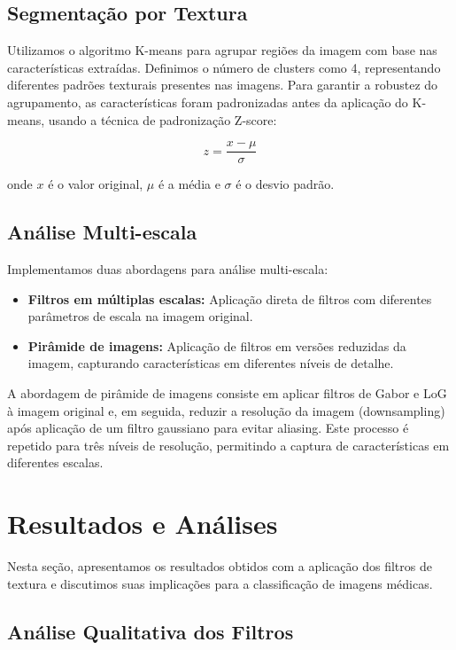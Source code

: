 \documentclass[sigconf,nonacm]{acmart}
\begin{document}
\subsection{Segmentação por Textura}

Utilizamos o algoritmo K-means para agrupar regiões da imagem com base nas características extraídas. Definimos o número de clusters como 4, representando diferentes padrões texturais presentes nas imagens. Para garantir a robustez do agrupamento, as características foram padronizadas antes da aplicação do K-means, usando a técnica de padronização Z-score:

\[
z = \frac{x - \mu}{\sigma}
\]

onde \(x\) é o valor original, \(\mu\) é a média e \(\sigma\) é o desvio padrão.

\subsection{Análise Multi-escala}

Implementamos duas abordagens para análise multi-escala:

\begin{itemize}
  \item \textbf{Filtros em múltiplas escalas:} Aplicação direta de filtros com diferentes parâmetros de escala na imagem original.
  \item \textbf{Pirâmide de imagens:} Aplicação de filtros em versões reduzidas da imagem, capturando características em diferentes níveis de detalhe.
\end{itemize}

A abordagem de pirâmide de imagens consiste em aplicar filtros de Gabor e LoG à imagem original e, em seguida, reduzir a resolução da imagem (downsampling) após aplicação de um filtro gaussiano para evitar aliasing. Este processo é repetido para três níveis de resolução, permitindo a captura de características em diferentes escalas.

\section{Resultados e Análises}

Nesta seção, apresentamos os resultados obtidos com a aplicação dos filtros de textura e discutimos suas implicações para a classificação de imagens médicas.

\subsection{Análise Qualitativa dos Filtros}
\end{document}
